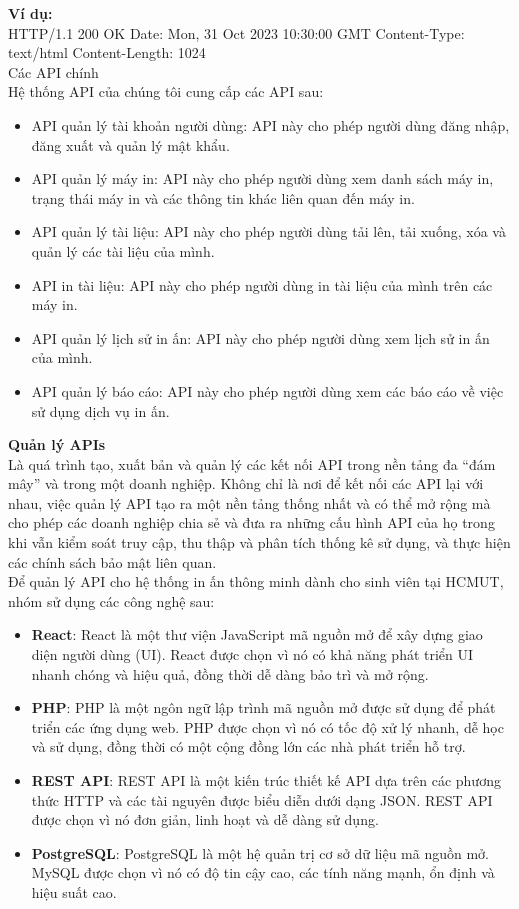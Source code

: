 \documentclass[a4paper]{article}
\begin{document}
\textbf{Ví dụ:}\\
HTTP/1.1 200 OK
Date: Mon, 31 Oct 2023 10:30:00 GMT
Content-Type: text/html
Content-Length: 1024\\
Các API chính\\
Hệ thống API của chúng tôi cung cấp các API sau:
\begin{itemize}
    \item API quản lý tài khoản người dùng: API này cho phép người dùng đăng nhập, đăng xuất và quản lý mật khẩu.
    \item API quản lý máy in: API này cho phép người dùng xem danh sách máy in, trạng thái máy in và các thông tin khác liên quan đến máy in.
    \item API quản lý tài liệu: API này cho phép người dùng tải lên, tải xuống, xóa và quản lý các tài liệu của mình.
    \item API in tài liệu: API này cho phép người dùng in tài liệu của mình trên các máy in.
    \item API quản lý lịch sử in ấn: API này cho phép người dùng xem lịch sử in ấn của mình.
    \item API quản lý báo cáo: API này cho phép người dùng xem các báo cáo về việc sử dụng dịch vụ in ấn.
\end{itemize}
\textbf{}\textbf{Quản lý APIs}\\
Là quá trình tạo, xuất bản và quản lý các kết nối API trong nền tảng đa “đám mây” và trong một doanh nghiệp. Không chỉ là nơi để kết nối các API lại với nhau, việc quản lý API tạo ra một nền tảng thống nhất và có thể mở rộng mà cho phép các doanh nghiệp chia sẻ và đưa ra những cấu hình API của họ trong khi vẫn kiểm soát truy cập, thu thập và phân tích thống kê sử dụng, và thực hiện các chính sách bảo mật liên quan.\\
Để quản lý API cho hệ thống in ấn thông minh dành cho sinh viên tại HCMUT, nhóm sử dụng các công nghệ sau:
\begin{itemize}
    \item \textbf{React}: React là một thư viện JavaScript mã nguồn mở để xây dựng giao diện người dùng (UI). React được chọn vì nó có khả năng phát triển UI nhanh chóng và hiệu quả, đồng thời dễ dàng bảo trì và mở rộng.
    \item \textbf{PHP}: PHP là một ngôn ngữ lập trình mã nguồn mở được sử dụng để phát triển các ứng dụng web. PHP được chọn vì nó có tốc độ xử lý nhanh, dễ học và sử dụng, đồng thời có một cộng đồng lớn các nhà phát triển hỗ trợ.
    \item \textbf{REST API}: REST API là một kiến trúc thiết kế API dựa trên các phương thức HTTP và các tài nguyên được biểu diễn dưới dạng JSON. REST API được chọn vì nó đơn giản, linh hoạt và dễ dàng sử dụng.
    \item \textbf{PostgreSQL}: PostgreSQL là một hệ quản trị cơ sở dữ liệu mã nguồn mở. MySQL được chọn vì nó có độ tin cậy cao, các tính năng mạnh, ổn định và hiệu suất cao.
\end{itemize}
\end{document}

